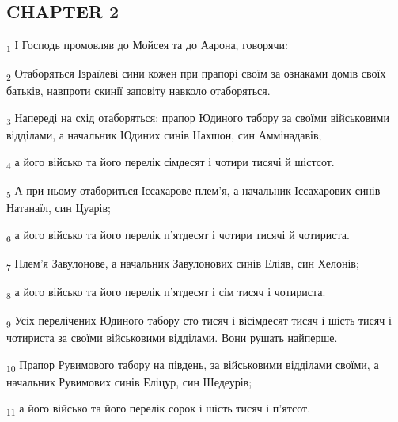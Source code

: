 \subsection{CHAPTER 2}
\begin{tcolorbox}
\textsubscript{1} І Господь промовляв до Мойсея та до Аарона, говорячи:
\end{tcolorbox}
\begin{tcolorbox}
\textsubscript{2} Отаборяться Ізраїлеві сини кожен при прапорі своїм за ознаками домів своїх батьків, навпроти скинії заповіту навколо отаборяться.
\end{tcolorbox}
\begin{tcolorbox}
\textsubscript{3} Напереді на схід отаборяться: прапор Юдиного табору за своїми військовими відділами, а начальник Юдиних синів Нахшон, син Аммінадавів;
\end{tcolorbox}
\begin{tcolorbox}
\textsubscript{4} а його військо та його перелік сімдесят і чотири тисячі й шістсот.
\end{tcolorbox}
\begin{tcolorbox}
\textsubscript{5} А при ньому отабориться Іссахарове плем'я, а начальник Іссахарових синів Натанаїл, син Цуарів;
\end{tcolorbox}
\begin{tcolorbox}
\textsubscript{6} а його військо та його перелік п'ятдесят і чотири тисячі й чотириста.
\end{tcolorbox}
\begin{tcolorbox}
\textsubscript{7} Плем'я Завулонове, а начальник Завулонових синів Еліяв, син Хелонів;
\end{tcolorbox}
\begin{tcolorbox}
\textsubscript{8} а його військо та його перелік п'ятдесят і сім тисяч і чотириста.
\end{tcolorbox}
\begin{tcolorbox}
\textsubscript{9} Усіх перелічених Юдиного табору сто тисяч і вісімдесят тисяч і шість тисяч і чотириста за своїми військовими відділами. Вони рушать найперше.
\end{tcolorbox}
\begin{tcolorbox}
\textsubscript{10} Прапор Рувимового табору на південь, за військовими відділами своїми, а начальник Рувимових синів Еліцур, син Шедеурів;
\end{tcolorbox}
\begin{tcolorbox}
\textsubscript{11} а його військо та його перелік сорок і шість тисяч і п'ятсот.
\end{tcolorbox}
